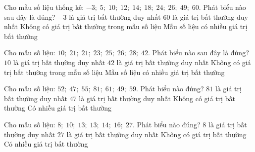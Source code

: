 \begin{ex}
	Cho mẫu số liệu thống kê: $-3;\; 5;\; 10;\; 12;\; 14;\; 18;\; 24;\; 26;\; 49;\; 60$. Phát biểu nào sau đây là đúng?
	\choice
	{$-3$ là giá trị bất thường duy nhất}
	{\True $60$ là giá trị bất thường duy nhất}
	{Không có giá trị bất thường trong mẫu số liệu}
	{Mẫu số liệu có nhiều giá trị bất thường}
\end{ex}

\begin{ex}
	Cho mẫu số liệu: $10;\; 21;\; 21;\; 23;\; 25;\; 26;\; 28;\; 42$. Phát biểu nào sau đây là đúng?
	\choice
	{$10$ là giá trị bất thường duy nhất}
	{$42$ là giá trị bất thường duy nhất}
	{\True Không có giá trị bất thường trong mẫu số liệu}
	{Mẫu số liệu có nhiều giá trị bất thường}
\end{ex}

\begin{ex}
	Cho mẫu số liệu: $52;\; 47;\; 55;\; 81;\; 61;\; 49;\; 59$. Phát biểu nào đúng?
	\choice
	{\True $81$ là giá trị bất thường duy nhất}
	{$47$ là giá trị bất thường duy nhất}
	{Không có giá trị bất thường}
	{Có nhiều giá trị bất thường}
\end{ex}

\begin{ex}
	Cho mẫu số liệu: $8;\; 10;\; 13;\; 13;\; 14;\; 16;\; 27$. Phát biểu nào đúng?
	\choice
	{$8$ là giá trị bất thường duy nhất}
	{\True $27$ là giá trị bất thường duy nhất}
	{Không có giá trị bất thường}
	{Có nhiều giá trị bất thường}
\end{ex}

